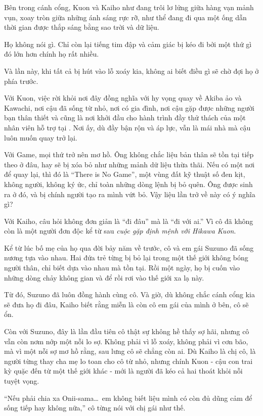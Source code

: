 \documentclass[../main.tex]{subfiles}
\begin{document}
\ct

Bên trong cánh cổng, Kuon và Kaiho như đang trôi lơ lửng giữa hàng vạn mảnh vụn, xoay tròn giữa những ánh sáng rực rỡ, như thể đang đi qua một ống dẫn thời gian được thắp sáng bằng sao trời và dữ liệu.

Họ không nói gì. Chỉ còn lại tiếng tim đập và cảm giác bị kéo đi bởi một thứ gì đó lớn hơn chính họ rất nhiều.

Và lần này, khi tất cả bị hút vào lỗ xoáy kia, không ai biết điều gì sẽ chờ đợi họ ở phía trước.

Với Kuon, việc rời khỏi nơi đây đồng nghĩa với hy vọng quay về Akiba ảo và Kawachi, nơi cậu đã sống từ nhỏ, nơi có gia đình, nơi cậu gặp được những người bạn thân thiết và cũng là nơi khởi đầu cho hành trình đầy thử thách của một nhân viên hỗ trợ tại \hll. Nơi ấy, dù đầy bận rộn và áp lực, vẫn là mái nhà mà cậu luôn muốn quay trở lại.

Với Game, mọi thứ trở nên mơ hồ. Ông không chắc liệu bản thân sẽ tồn tại tiếp theo ở đâu, hay sẽ bị xóa bỏ như những mảnh dữ liệu thừa thãi. Nếu có một nơi để quay lại, thì đó là ``There is No Game'', một vùng đất kỹ thuật số đen kịt, không người, không ký ức, chỉ toàn những dòng lệnh bị bỏ quên. Ông được sinh ra ở đó, và bị chính người tạo ra mình vứt bỏ. Vậy liệu lần trở về này có ý nghĩa gì?

Với Kaiho, câu hỏi không đơn giản là ``đi đâu'' mà là ``đi với ai.'' Vì cô đã không còn là một người đơn độc kể từ sau \emph{cuộc gặp định mệnh với Hikawa Kuon}.

Kể từ lúc bố mẹ của họ qua đời bảy năm về trước, cô và em gái Suzuno đã sống nương tựa vào nhau. Hai đứa trẻ từng bị bỏ lại trong một thế giới không bóng người thân, chỉ biết dựa vào nhau mà tồn tại. Rồi một ngày, họ bị cuốn vào những dòng chảy không gian và để rồi rơi vào thế giới xa lạ này.

Từ đó, Suzuno đã luôn đồng hành cùng cô. Và giờ, dù không chắc cánh cổng kia sẽ đưa họ đi đâu, Kaiho biết rằng miễn là còn cô em gái của mình ở bên, cô sẽ ổn.

Còn với Suzuno, đây là lần đầu tiên cô thật sự không hề thấy sợ hãi, nhưng cô vẫn còn nơm nớp một nỗi lo sợ. Không phải vì lỗ xoáy, không phải vì cơn bão, mà vì một nỗi sợ mơ hồ rằng, sau lưng cô sẽ chẳng còn ai. Dù Kaiho là chị cô, là người từng thay cha mẹ lo toan cho cô từ nhỏ, nhưng chính Kuon - cậu con trai kỳ quặc đến từ một thế giới khác - mới là người đã kéo cả hai thoát khỏi nỗi tuyệt vọng.

``Nếu phải chia xa Onii-sama\dots\ em không biết liệu mình có còn đủ dũng cảm để sống tiếp hay không nữa,'' cô từng nói với chị gái như thế.
\end{document}
